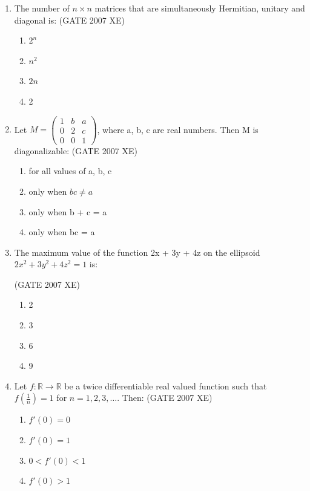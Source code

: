 \documentclass[journal,cmex10]{IEEEtran}
\theoremstyle{remark}
\newcommand{\myvec}[1]{\ensuremath{\begin{pmatrix}#1\end{pmatrix}}}
\numberwithin{equation}{enumi}
\numberwithin{figure}{enumi}
\begin{document}
\begin{enumerate}
    \item The number of $n \times n$ matrices that are simultaneously Hermitian, unitary and diagonal is:
    \hfill{(GATE 2007 XE)}
    \begin{multicols}{4}
    \begin{enumerate}[label=\alph*)]
        \item $2^n$
        \item $n^2$
        \item $2n$
        \item 2
    \end{enumerate}
    \end{multicols}

    \item Let $M = \myvec{ 1 & b & a \\ 0 & 2 & c \\ 0 & 0 & 1}$, where  a, b, c are real numbers. Then M is diagonalizable:    
    \hfill{(GATE 2007 XE)}
    \begin{multicols}{4}
    \begin{enumerate}
        \item for all values of a, b, c
        \item only when $bc \neq a$
        \item only when b + c = a 
        \item only when bc = a
    \end{enumerate}
\end{multicols}

    \item The maximum value of the function 2x + 3y + 4z  on the ellipsoid $2x^2 + 3y^2 + 4z^2 = 1$ is:
    
    \hfill{(GATE 2007 XE)}
    \begin{multicols}{4}
    \begin{enumerate}
        \item 2
        \item 3
        \item 6
        \item 9
    \end{enumerate}
\end{multicols}

    \item Let $f: \mathbb{R} \to \mathbb{R}$ be a twice differentiable real valued function such that $f\left(\frac{1}{n}\right) = 1$ for  $n = 1, 2, 3, \dots$. Then:
\hfill{(GATE 2007 XE)}
\begin{multicols}{4}
    \begin{enumerate}
        \item $f'(0) = 0$
        \item  $f'(0) = 1$
        \item $0 < f'(0) < 1$
        \item $f'(0) > 1$
    \end{enumerate}
\end{multicols}


\end{enumerate}
\end{document}
